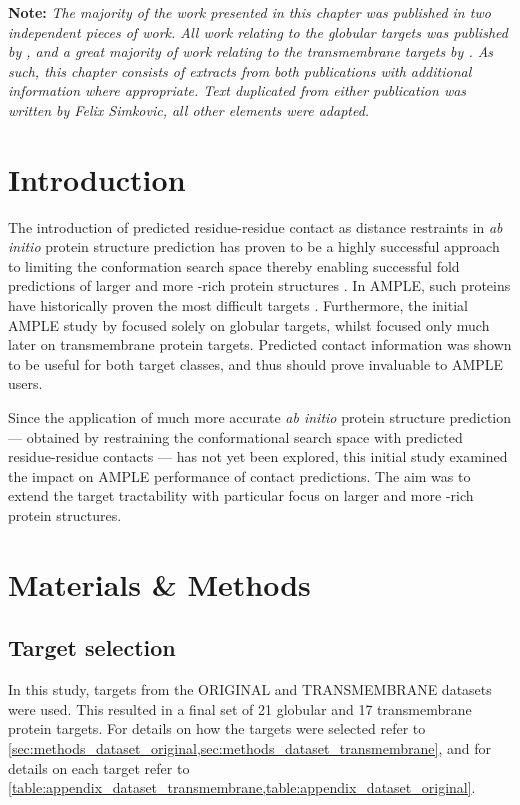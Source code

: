\textbf{Note: }\textit{The majority of the work presented in this chapter was published in two independent pieces of work. All work relating to the globular targets was published by \textcite{Simkovic2016-wk}, and a great majority of work relating to the transmembrane targets by \textcite{Thomas2017-sh}. As such, this chapter consists of extracts from both publications with additional information where appropriate. Text duplicated from either publication was written by Felix Simkovic, all other elements were adapted.}

\section{Introduction}
The introduction of predicted residue-residue contact as distance restraints in \textit{ab initio} protein structure prediction has proven to be a highly successful approach to limiting the conformation search space thereby enabling successful fold predictions of larger and more \textbeta-rich protein structures \cite[e.g.,][]{Marks2011-os,Michel2014-eg,Kosciolek2014-bt,Ovchinnikov2015-tn,Ovchinnikov2016-jj,Michel2017-xh,De_Oliveira2017-sg,Ovchinnikov2017-nd,Wang2017-rx}. In AMPLE, such proteins have historically proven the most difficult targets \cite{Bibby2012-lm}. Furthermore, the initial AMPLE study by \textcite{Bibby2012-lm} focused solely on globular targets, whilst \textcite{Thomas2017-qu} focused only much later on transmembrane protein targets. Predicted contact information was shown to be useful for both target classes, and thus should prove invaluable to AMPLE users.

Since the application of much more accurate \textit{ab initio} protein structure prediction --- obtained by restraining the conformational search space with predicted residue-residue contacts --- has not yet been explored, this initial study examined the impact on AMPLE performance of contact predictions. The aim was to extend the target tractability with particular focus on larger and more \textbeta-rich protein structures.

\section{Materials \& Methods} \label{sec:ample_proof_methods}
\subsection{Target selection}
In this study, targets from the ORIGINAL and TRANSMEMBRANE datasets were used. This resulted in a final set of 21 globular and 17 transmembrane protein targets. For details on how the targets were selected refer to \cref{sec:methods_dataset_original,sec:methods_dataset_transmembrane}, and for details on each target refer to \cref{table:appendix_dataset_transmembrane,table:appendix_dataset_original}.

